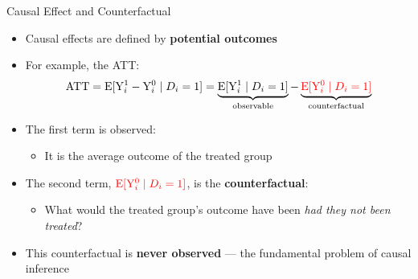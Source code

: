 \documentclass[hyperref={pdfpagelabels=false}]{beamer}
\begin{document}
	
\begin{frame}{Causal Effect and Counterfactual}
	\begin{itemize}
		\item Causal effects are defined by \textbf{potential outcomes} 
        \vspace{0.2cm}
        \item For example, the ATT:
		\begin{equation*}
			\text{ATT} = \mathrm{E}[\mathrm{Y}^{1}_{i} - \mathrm{Y}^{0}_{i} \mid D_i = 1]
			= \underbrace{\mathrm{E}[\mathrm{Y}^{1}_{i} \mid D_i=1]}_{\text{observable}} - \underbrace{{\color{red}\mathrm{E}[\mathrm{Y}^{0}_{i} \mid D_i=1]}}_{\text{counterfactual}}
		\end{equation*}
		\vspace{0.1cm}
		\item The first term is observed: 
        		\vspace{0.2cm}
        	\begin{itemize}
        \item It is the average outcome of the treated group
		\vspace{0.2cm}
        	\end{itemize}

		\item The second term, ${\color{red}\mathrm{E}[\mathrm{Y}^{0}_{i} \mid D_i=1]}$, is the \textbf{counterfactual}: 
        \vspace{0.2cm}
        	\begin{itemize}
        \item What would the treated group's outcome have been \emph{had they not been treated}?
		\vspace{0.2cm}
                	\end{itemize}

		\item This counterfactual is \textbf{never observed} --- the fundamental problem of causal inference
	\end{itemize}
\end{frame}
\end{document}
